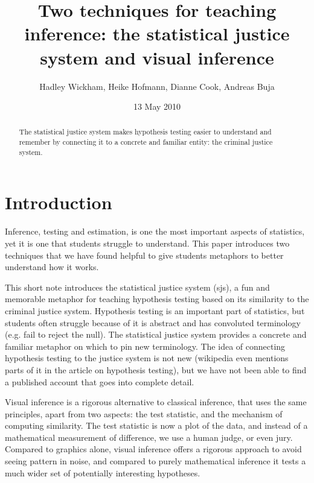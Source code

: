 \documentclass[oneside]{article}
\begin{document}
\title{Two techniques for teaching inference: the statistical justice system and visual inference}
\author{Hadley Wickham, Heike Hofmann, Dianne Cook, Andreas Buja}
\date{13 May 2010}

\maketitle
\begin{abstract}

The statistical justice system makes hypothesis testing easier to understand and remember by connecting it to a concrete and familiar entity: the criminal justice system.

\end{abstract}

\section{Introduction}

Inference, testing and estimation, is one the most important aspects of statistics, yet it is one that students struggle to understand. This paper introduces two techniques that we have found helpful to give students metaphors to better understand how it works. 

This short note introduces the statistical justice system ({\sc sjs}), a fun and memorable metaphor for teaching hypothesis testing based on its similarity to the criminal justice system. Hypothesis testing is an important part of statistics, but students often struggle because of it is abstract and has convoluted terminology (e.g. fail to reject the null). The statistical justice system provides a concrete and familiar metaphor on which to pin new terminology. The idea of connecting hypothesis testing to the justice system is not new (wikipedia even mentions parts of it in the article on hypothesis testing), but we have not been able to find a published account that goes into complete detail.

Visual inference \citep{buja:2009,me:inf4info} is a rigorous alternative to classical inference, that uses the same principles, apart from two aspects: the test statistic, and the mechanism of computing similarity. The test statistic is now a plot of the data, and instead of a mathematical measurement of difference, we use a human judge, or even jury. Compared to graphics alone, visual inference offers a rigorous approach to avoid seeing pattern in noise,  and compared to purely mathematical inference it tests a much wider set of potentially interesting hypotheses.
\end{document}
